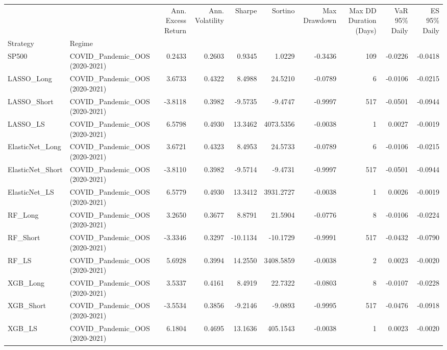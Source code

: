 \begin{tabular}{llrrrrrrrr}
\toprule
 &  & Ann. Excess Return & Ann. Volatility & Sharpe & Sortino & Max Drawdown & Max DD Duration (Days) & VaR 95\% Daily & ES 95\% Daily \\
Strategy & Regime &  &  &  &  &  &  &  &  \\
\midrule
SP500 & COVID\_Pandemic\_OOS (2020-2021) & 0.2433 & 0.2603 & 0.9345 & 1.0229 & -0.3436 & 109 & -0.0226 & -0.0418 \\
\cline{1-10}
LASSO\_Long & COVID\_Pandemic\_OOS (2020-2021) & 3.6733 & 0.4322 & 8.4988 & 24.5210 & -0.0789 & 6 & -0.0106 & -0.0215 \\
\cline{1-10}
LASSO\_Short & COVID\_Pandemic\_OOS (2020-2021) & -3.8118 & 0.3982 & -9.5735 & -9.4747 & -0.9997 & 517 & -0.0501 & -0.0944 \\
\cline{1-10}
LASSO\_LS & COVID\_Pandemic\_OOS (2020-2021) & 6.5798 & 0.4930 & 13.3462 & 4073.5356 & -0.0038 & 1 & 0.0027 & -0.0019 \\
\cline{1-10}
ElasticNet\_Long & COVID\_Pandemic\_OOS (2020-2021) & 3.6721 & 0.4323 & 8.4953 & 24.5733 & -0.0789 & 6 & -0.0106 & -0.0215 \\
\cline{1-10}
ElasticNet\_Short & COVID\_Pandemic\_OOS (2020-2021) & -3.8110 & 0.3982 & -9.5714 & -9.4731 & -0.9997 & 517 & -0.0501 & -0.0944 \\
\cline{1-10}
ElasticNet\_LS & COVID\_Pandemic\_OOS (2020-2021) & 6.5779 & 0.4930 & 13.3412 & 3931.2727 & -0.0038 & 1 & 0.0026 & -0.0019 \\
\cline{1-10}
RF\_Long & COVID\_Pandemic\_OOS (2020-2021) & 3.2650 & 0.3677 & 8.8791 & 21.5904 & -0.0776 & 8 & -0.0106 & -0.0224 \\
\cline{1-10}
RF\_Short & COVID\_Pandemic\_OOS (2020-2021) & -3.3346 & 0.3297 & -10.1134 & -10.1729 & -0.9991 & 517 & -0.0432 & -0.0790 \\
\cline{1-10}
RF\_LS & COVID\_Pandemic\_OOS (2020-2021) & 5.6928 & 0.3994 & 14.2550 & 3408.5859 & -0.0038 & 2 & 0.0023 & -0.0020 \\
\cline{1-10}
XGB\_Long & COVID\_Pandemic\_OOS (2020-2021) & 3.5337 & 0.4161 & 8.4919 & 22.7322 & -0.0803 & 8 & -0.0107 & -0.0228 \\
\cline{1-10}
XGB\_Short & COVID\_Pandemic\_OOS (2020-2021) & -3.5534 & 0.3856 & -9.2146 & -9.0893 & -0.9995 & 517 & -0.0476 & -0.0918 \\
\cline{1-10}
XGB\_LS & COVID\_Pandemic\_OOS (2020-2021) & 6.1804 & 0.4695 & 13.1636 & 405.1543 & -0.0038 & 1 & 0.0023 & -0.0020 \\

\end{tabular}
